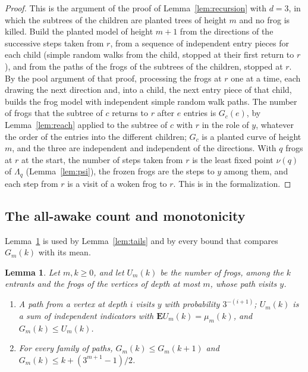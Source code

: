 \documentclass[11pt]{amsart}
\newtheorem{lemma}[theorem]{Lemma}
\theoremstyle{definition}
\numberwithin{equation}{section}
\newcommand{\lean}[1]{\ignorespaces}
\newcommand{\E}{\mathbf{E}}
\begin{document}
\begin{proof}
This is the argument of the proof of Lemma~\ref{lem:recursion} with $d=3$, in which the subtrees of the children are planted trees of height $m$ and no frog is killed. Build the planted model of height $m+1$ from the directions of the successive steps taken from $r$, from a sequence of independent entry pieces for each child (simple random walks from the child, stopped at their first return to $r$), and from the paths of the frogs of the subtrees of the children, stopped at $r$. By the pool argument of that proof, processing the frogs at $r$ one at a time, each drawing the next direction and, into a child, the next entry piece of that child, builds the frog model with independent simple random walk paths. The number of frogs that the subtree of $c$ returns to $r$ after $e$ entries is $G_c(e)$, by Lemma~\ref{lem:reach} applied to the subtree of $c$ with $r$ in the role of $y$, whatever the order of the entries into the different children; $G_c$ is a planted curve of height $m$, and the three are independent and independent of the directions. With $q$ frogs at $r$ at the start, the number of steps taken from $r$ is the least fixed point $\nu(q)$ of $\Lambda_q$ (Lemma~\ref{lem:psi}), the frozen frogs are the steps to $y$ among them, and each step from $r$ is a visit of a woken frog to $r$. This is  in the formalization.
\end{proof}

\subsection*{The all-awake count and monotonicity}
Lemma~\ref{lem:awake} is used by Lemma~\ref{lem:tails} and by every bound that compares $G_m(k)$ with its mean.

\begin{lemma}\label{lem:awake}\lean{FrogModel.D3.Assembly.lintegral_plantedG_le_proof, FrogModel.D3.Iface.lintegral_plantedG_le_of, FrogModel.D3.LaneA.prob_reach_proof, FrogModel.D3.Iface.plantedG_le_frogs_proof, FrogModel.D3.Iface.lintegral_plantedG_le, FrogModel.D3.Iface.prob_reach, FrogModel.D3.Iface.plantedG_mono, FrogModel.D3.Iface.plantedG_le_frogs} %
Let $m,k\ge0$, and let $U_m(k)$ be the number of frogs, among the $k$ entrants and the frogs of the vertices of depth at most $m$, whose path visits $y$.
\begin{enumerate}
\item A path from a vertex at depth $i$ visits $y$ with probability $3^{-(i+1)}$; $U_m(k)$ is a sum of independent indicators with $\E U_m(k)=\mu_m(k)$, and $G_m(k)\le U_m(k)$.
\item For every family of paths, $G_m(k)\le G_m(k+1)$ and $G_m(k)\le k+(3^{m+1}-1)/2$.
\end{enumerate}
\end{lemma}
\end{document}
